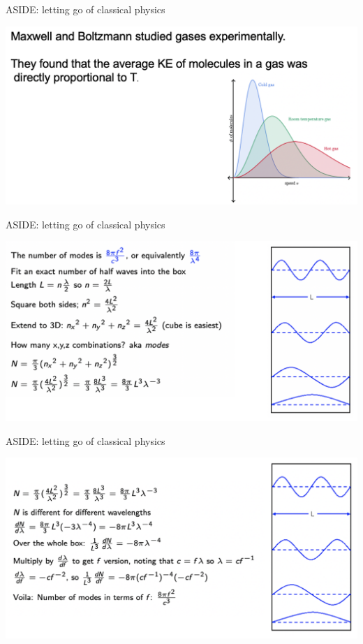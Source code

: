 \begin{frame}{ASIDE: letting go of classical physics }
\small

\includegraphics[scale=0.45]{rj2}
\end{frame}
\begin{frame}{ASIDE: letting go of classical physics }
\small

\includegraphics[scale=0.45]{rj3}
\end{frame}
\begin{frame}{ASIDE: letting go of classical physics }
\small

\includegraphics[scale=0.45]{rj4}
\end{frame}

